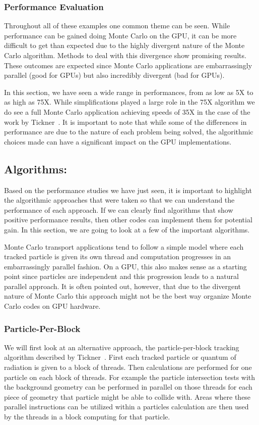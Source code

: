 \subsubsection*{\textbf{Performance Evaluation}}
Throughout all of these examples one common theme can be seen.
%
While performance can be gained doing Monte Carlo on the GPU, it can be more difficult to get than expected due to the highly divergent nature of the Monte Carlo algorithm.
%
Methods to deal with this divergence show promising results.
%
These outcomes are expected since Monte Carlo applications are embarrassingly parallel (good for GPUs) but also incredibly divergent (bad for GPUs).
%

In this section, we have seen a wide range in performances, from as low as 5X to as high as 75X.
%
While simplifications played a large role in the 75X algorithm we do see a full Monte Carlo application achieving speeds of 35X in the case of the work by Tickner~\cite{tickner2010monte}.
%
It is important to note that while some of the differences in performance are due to the nature of each problem being solved, the algorithmic choices made can have a significant impact on the GPU implementations.
%

\subsection*{\textbf{Algorithms:}}

Based on the performance studies we have just seen, it is important to highlight the algorithmic approaches that were taken so that we can understand the performance of each approach.
%
If we can clearly find algorithms that show positive performance results, then other codes can implement them for potential gain.
%
In this section, we are going to look at a few of the important algorithms.
%

%
Monte Carlo transport applications tend to follow a simple model where each tracked particle is given its own thread and computation progresses in an embarrassingly parallel fashion. 
%
On a GPU, this also makes sense as a starting point since particles are independent and this progression leads to a natural parallel approach.
%
It is often pointed out, however, that due to the divergent nature of Monte Carlo this approach might not be the best way organize Monte Carlo codes on GPU hardware.
%

\subsubsection*{\textbf{Particle-Per-Block}}
We will first look at an alternative approach, the particle-per-block tracking algorithm described by Tickner~\cite{tickner2010monte}.
%
First each tracked particle or quantum of radiation is given to a block of threads.
%
Then calculations are performed for one particle on each block of threads.
%
For example the particle intersection tests with the background geometry can be performed in parallel on those threads for each piece of geometry that particle might be able to collide with.
%
Areas where these parallel instructions can be utilized within a particles calculation are then used by the threads in a block computing for that particle.
%

